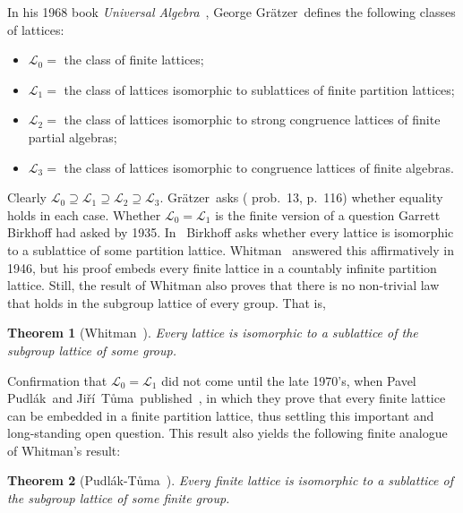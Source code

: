 \documentclass[cm,dissertation,actual,final]{uhthesis}
\theoremstyle{plain}
\newtheorem{theorem}{Theorem}[section]
\theoremstyle{definition}
\theoremstyle{remark}
\numberwithin{theorem}{section}
\numberwithin{claim}{chapter}
\numberwithin{equation}{section}
\numberwithin{conjecture}{chapter}
\newcommand{\indexTuma}{\index{T\r{u}ma, Ji\v{r}\'i}}
\newcommand{\Jiri}{Ji\v{r}\'i}
\newcommand{\Tuma}{T\r{u}ma}
\newcommand{\Pudlak}{Pudl\'ak}
\newcommand{\Gratzer}{Gr\"{a}tzer}
\newcommand{\<}{\ensuremath{\langle}}
\renewcommand{\>}{\ensuremath{\rangle}}
\newcommand{\0}{\ensuremath{\mathbf{0}}}
\newcommand{\1}{\ensuremath{\mathbf{1}}}
\newcommand{\2}{\ensuremath{\mathbf{2}}}
\newcommand{\3}{\ensuremath{\mathbf{3}}}
\newcommand{\4}{\ensuremath{\mathbf{4}}}
\newcommand{\5}{\ensuremath{\mathbf{5}}}
\newcommand{\sL}{\ensuremath{\mathscr{L}}}
\begin{document}
%
In his 1968 book {\it Universal Algebra}~\cite{Gratzer:1968}, George \Gratzer\ defines the
following classes of lattices:
\begin{itemize}
%
\item $\sL_0 =$ the class of finite lattices;
%
\item $\sL_1 =$ the class of lattices isomorphic to sublattices of finite partition lattices;
%
\item $\sL_2 =$ the class of lattices isomorphic to strong congruence lattices of
  finite partial algebras;
%
\item $\sL_3 =$ the class of lattices isomorphic to congruence lattices of finite algebras.
\end{itemize}
Clearly $\sL_0 \supseteq \sL_1 \supseteq \sL_2 \supseteq \sL_3$.
\Gratzer\ asks (\cite{Gratzer:1968} prob.~13, p.~116) whether equality holds
in each case. 
Whether $\sL_0 = \sL_1$ is the finite version of a question 
%
Garrett Birkhoff had asked by 1935.  
In~\cite{Birkhoff:1935} Birkhoff asks whether every lattice is isomorphic 
%
to a sublattice of some partition lattice.  Whitman~\cite{Whitman:1946} answered
this affirmatively in 1946, but his proof embeds every finite lattice in a countably
infinite partition lattice.  Still, the result of Whitman also proves that 
there is no non-trivial law that holds in the subgroup lattice of every group.
That is,
\begin{theorem}[Whitman~\cite{Whitman:1946}] Every lattice is isomorphic to a
  sublattice of the subgroup lattice of some group.
\end{theorem}
Confirmation that $\sL_0=\sL_1$ did not come until the late 1970's, when 
%
\indexTuma%
Pavel \Pudlak\ and \Jiri\ \Tuma\ published~\cite{Pudlak:1980}, in which they
prove that every finite lattice can be embedded in a finite partition lattice,
thus settling this important and long-standing open question.
This result also yields the following finite analogue of Whitman's result:
\begin{theorem}[\Pudlak-\Tuma~\cite{Pudlak:1980}]
Every finite lattice is isomorphic to a sublattice of the subgroup lattice of
some finite group.
\end{theorem}
\end{document}
